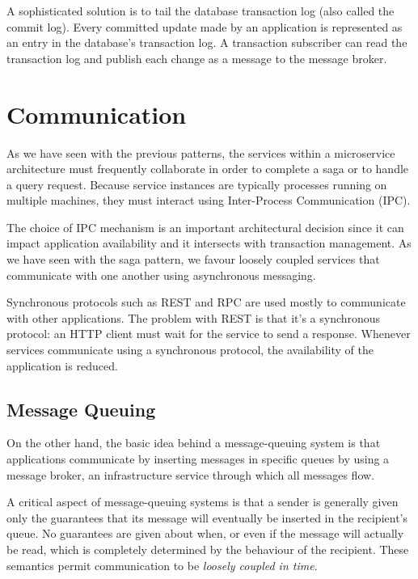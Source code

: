 \documentclass[conference]{IEEEtran}
\begin{document}
A sophisticated solution is to tail the database transaction log (also called the commit log). Every committed update made by an application is represented as an entry in the database’s transaction log. A transaction subscriber can read the transaction log and publish each change as a message to the message broker. \cite{log-tailing}

\section{Communication}

As we have seen with the previous patterns, the services within a microservice architecture must frequently collaborate in order to complete a saga or to handle a query request. Because service instances are typically processes running on multiple machines, they must interact using Inter-Process Communication (IPC).

The choice of IPC mechanism is an important architectural decision since it can impact application availability and it intersects with transaction management. As we have seen with the saga pattern, we favour loosely coupled services that communicate with one another using asynchronous messaging.

Synchronous protocols such as REST and RPC are used mostly to communicate with other applications. The problem with REST is that it’s a synchronous protocol: an HTTP client must wait for the service to send a response. Whenever services communicate using a synchronous protocol, the availability of the application is reduced.

\subsection{Message Queuing}

On the other hand, the basic idea behind a message-queuing system is that applications communicate by inserting messages in specific queues by using a message broker, an infrastructure service through which all messages flow.

A critical aspect of message-queuing systems is that a sender is generally given only the guarantees that its message will eventually be inserted in the recipient’s queue. No guarantees are given about when, or even if the message will actually be read, which is completely determined by the behaviour of the recipient. These semantics permit communication to be \textit{loosely coupled in time}.
\end{document}

